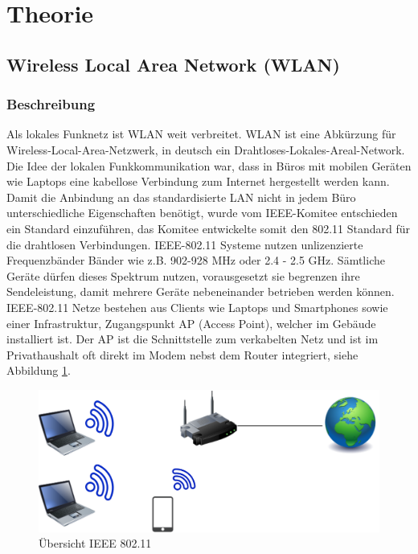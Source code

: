 \section{Theorie}
\subsection{Wireless Local Area Network (WLAN)} 
\subsubsection{Beschreibung}
Als lokales Funknetz ist WLAN weit verbreitet. WLAN ist eine Abkürzung für Wireless-Local-Area-Netzwerk, in deutsch ein Drahtloses-Lokales-Areal-Network. Die Idee der lokalen Funkkommunikation war, dass in Büros mit mobilen Geräten wie Laptops eine kabellose Verbindung zum Internet hergestellt werden kann. Damit die Anbindung an das standardisierte LAN nicht in jedem Büro unterschiedliche Eigenschaften benötigt, wurde vom IEEE-Komitee entschieden ein Standard einzuführen, das Komitee entwickelte somit den 802.11 Standard für die drahtlosen Verbindungen. IEEE-802.11 Systeme nutzen unlizenzierte Frequenzbänder Bänder wie z.B. 902-928 MHz oder 2.4 - 2.5 GHz. Sämtliche Geräte dürfen dieses Spektrum nutzen, vorausgesetzt sie begrenzen ihre Sendeleistung, damit mehrere Geräte nebeneinander betrieben werden können. IEEE-802.11 Netze bestehen aus Clients wie Laptops und Smartphones sowie einer Infrastruktur, Zugangspunkt AP (Access Point), welcher im Gebäude installiert ist. Der AP ist die Schnittstelle zum verkabelten Netz und ist im Privathaushalt oft direkt im Modem nebst dem Router integriert, siehe Abbildung \ref{pic: IEEE802.11}.


 \begin{figure}[H]
	\centering
	\includegraphics[width=\textwidth]{graphics/IEEE80211.png}
	\caption{Übersicht IEEE 802.11} 	
	\label{pic: IEEE802.11}
\end{figure} 
